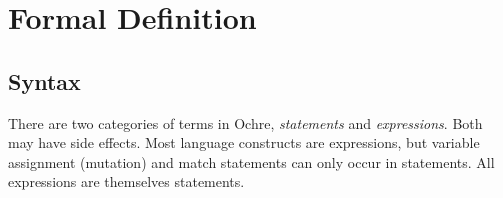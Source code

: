 \documentclass[12pt,twoside]{report}
\begin{document}

\cleardoublepage
\chapter{Formal Definition}
\label{chapter:definition}

\section{Syntax}
There are two categories of terms in Ochre, \textit{statements} and \textit{expressions}. Both may have side effects. Most language constructs are expressions, but variable assignment (mutation) and match statements can only occur in statements. All expressions are themselves statements.
\end{document}
